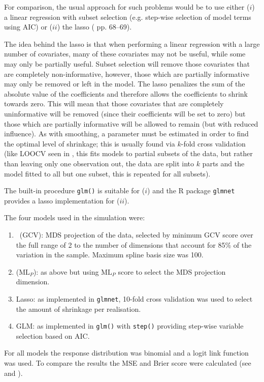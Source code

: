 For comparison, the usual approach for such problems would be to use either ($i$) a linear regression with subset selection (e.g. step-wise selection of model terms using AIC) or ($ii$) the lasso (\cite{elements} pp. 68--69). 

The idea behind the lasso is that when performing a linear regression with a large number of covariates, many of these covariates may not be useful, while some may only be partially useful\label{cor-5s11}. Subset selection will remove those covariates that are completely non-informative, however, those which are partially informative may only be removed or left in the model. The lasso penalizes the sum of the absolute value of the coefficients and therefore allows the coefficients to shrink towards zero. This will mean that those covariates that are completely uninformative will be removed (since their coefficients will be set to zero) but those which are partially informative will be allowed to remain (but with reduced influence). As with smoothing, a parameter must be estimated in order to find the optimal level of shrinkage; this is usually found via $k$-fold cross validation (like LOOCV seen in , this fits models to partial subsets of the data, but rather than leaving only one observation out, the data are\label{cor-r1-5} split into $k$ parts and the model fitted to all but one subset, this is repeated for all subsets). 

The built-in procedure \texttt{glm()} is suitable for ($i$) and the \textsf{R} package \texttt{glmnet} provides a lasso implementation for ($ii$).

The four models used in the simulation were:
\begin{enumerate}
	\item \mdsds\ (GCV): MDS projection of the data, selected by minimum GCV score over the full range of 2 to the number of dimensions that account for 85\% of the variation in the sample. Maximum spline basis size was 100.
	\item \mdsds\: ($\text{ML}_P$): as above but using $\text{ML}_P$ score to select the MDS projection dimension.
	\item Lasso: as implemented in \texttt{glmnet}, 10-fold cross validation was used to select the amount of shrinkage per realisation.
	\item GLM: as implemented in \texttt{glm()} with \texttt{step()} providing step-wise variable selection based on AIC.
\end{enumerate}
For all models the response distribution was binomial and a logit link function was used. To compare the results the MSE and Brier score were calculated (see  and ).

